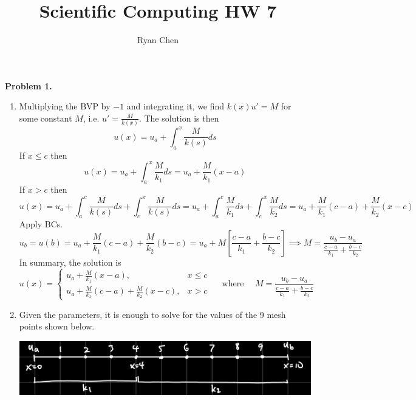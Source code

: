 \documentclass{article}
\title{Scientific Computing HW 7}
\author{Ryan Chen}
\def\tbf#1{\textbf{#1}}
\newcommand{\sbr}[1]{\left[#1\right]}
\newcommand{\imp}{\implies}
\begin{document}
	
\maketitle



\tbf{Problem 1.}

\begin{enumerate}[label=(\alph*)]
	
\item Multiplying the BVP by $-1$ and integrating it, we find $k(x)u'=M$ for some constant $M$, i.e. $u'=\frac{M}{k(x)}$. The solution is then
$$u(x) = u_a + \int_a^x \frac{M}{k(s)}ds$$
If $x\le c$ then
$$u(x) = u_a + \int_a^x \frac{M}{k_1}ds = u_a + \frac{M}{k_1}(x-a)$$
If $x>c$ then
$$u(x) = u_a + \int_a^c \frac{M}{k(s)}ds + \int_c^x \frac{M}{k(s)}ds
= u_a + \int_a^c \frac{M}{k_1}ds + \int_c^x \frac{M}{k_2}ds
= u_a + \frac{M}{k_1}(c - a) + \frac{M}{k_2}(x - c)$$
Apply BCs.
$$u_b = u(b)
= u_a + \frac{M}{k_1}(c - a) + \frac{M}{k_2}(b - c)
= u_a + M\sbr{\frac{c-a}{k_1} + \frac{b-c}{k_2}}
\imp M = \frac{u_b-u_a}{\frac{c-a}{k_1}+\frac{b-c}{k_2}}$$
In summary, the solution is
$$u(x) = 
\begin{cases}
	u_a + \frac{M}{k_1}(x-a), & x\le c\\
	u_a + \frac{M}{k_1}(c - a) + \frac{M}{k_2}(x - c), & x>c
\end{cases}
\quad \text{ where }
\quad M = \frac{u_b-u_a}{\frac{c-a}{k_1}+\frac{b-c}{k_2}}$$


\item Given the parameters, it is enough to solve for the values of the 9 mesh points shown below.
\begin{center}
	\includegraphics[scale=.1]{hw7 q1 mesh}
\end{center}


\end{enumerate}
\end{document}
